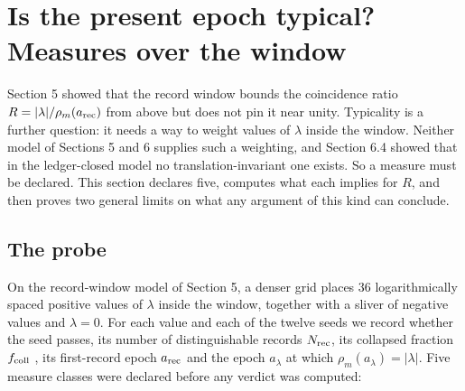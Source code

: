 \hypertarget{is-the-present-epoch-typical-measures-over-the-window}{%
\section{Is the present epoch typical? Measures over the
window}\label{is-the-present-epoch-typical-measures-over-the-window}}

Section 5 showed that the record window bounds the coincidence ratio
\(R=|\lambda|/\rho_m(a_{\rm rec})\) from above but does not pin it near
unity. Typicality is a further question: it needs a way to weight values
of \(\lambda\) inside the window. Neither model of Sections 5 and 6
supplies such a weighting, and Section 6.4 showed that in the
ledger-closed model no translation-invariant one exists. So a measure
must be declared. This section declares five, computes what each implies
for \(R\), and then proves two general limits on what any argument of
this kind can conclude.

\hypertarget{the-probe}{%
\subsection{The probe}\label{the-probe}}

On the record-window model of Section 5, a denser grid places 36
logarithmically spaced positive values of \(\lambda\) inside the window,
together with a sliver of negative values and \(\lambda=0\). For each
value and each of the twelve seeds we record whether the seed passes,
its number of distinguishable records \(N_{\rm rec}\), its collapsed
fraction \(f_{\rm coll}\) \citep{PressSchechter1974}, its first-record
epoch \(a_{\rm rec}\) and the epoch \(a_\lambda\) at which
\(\rho_m(a_\lambda)=|\lambda|\). Five measure classes were declared
before any verdict was computed:

